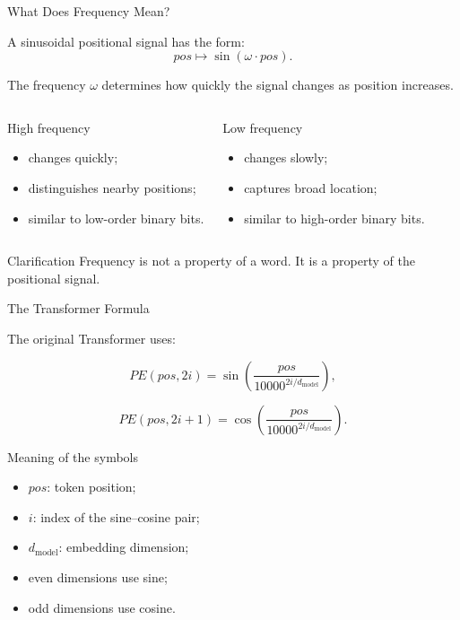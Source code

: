 \documentclass[aspectratio=169]{beamer}
\begin{document}
\begin{frame}{What Does Frequency Mean?}

A sinusoidal positional signal has the form:
\[
pos \mapsto \sin(\omega \cdot pos).
\]

The frequency \(\omega\) determines how quickly the signal changes as position increases.

\begin{columns}[T]


\begin{block}{High frequency}
\begin{itemize}
    \item changes quickly;
    \item distinguishes nearby positions;
    \item similar to low-order binary bits.
\end{itemize}
\end{block}


\begin{block}{Low frequency}
\begin{itemize}
    \item changes slowly;
    \item captures broad location;
    \item similar to high-order binary bits.
\end{itemize}
\end{block}

\end{columns}

\begin{alertblock}{Clarification}
Frequency is not a property of a word.  
It is a property of the positional signal.
\end{alertblock}

\end{frame}
%
%
\begin{frame}{The Transformer Formula}

The original Transformer uses:

\[
PE(pos,2i)
=
\sin
\left(
\frac{pos}{10000^{2i/d_{\text{model}}}}
\right),
\]

\[
PE(pos,2i+1)
=
\cos
\left(
\frac{pos}{10000^{2i/d_{\text{model}}}}
\right).
\]

\begin{block}{Meaning of the symbols}
\begin{itemize}
    \item \(pos\): token position;
    \item \(i\): index of the sine--cosine pair;
    \item \(d_{\text{model}}\): embedding dimension;
    \item even dimensions use sine;
    \item odd dimensions use cosine.
\end{itemize}
\end{block}

\end{frame}
\end{document}
